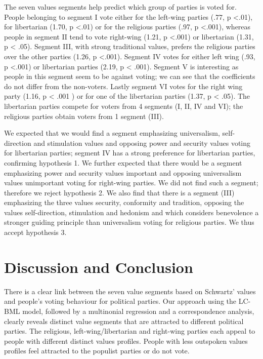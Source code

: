 \documentclass[12pt,letter]{article}\usepackage[]{graphicx}\usepackage[]{xcolor}
\begin{document}
The seven values segments help predict which group of parties is voted for. People belonging to segment I vote either for the left-wing parties (.77, p <.01), for libertarian (1.70, p <.01) or for the religious parties (.97, p <.001), whereas people in segment II tend to vote right-wing (1.21, p <.001) or libertarian (1.31, p < .05). Segment III, with strong traditional values, prefers the religious parties over the other parties (1.26, p <.001). Segment IV votes for either left wing (.93, p <.001) or libertarian parties (2.19, p < .001). Segment V is interesting as people in this segment seem to be against voting; we can see that the coefficients do not differ from the non-voters. Lastly segment VI votes for the right wing party (1.16, p < .001 ) or for one of the libertarian parties (1.37, p < .05). The libertarian parties compete for voters from 4 segments (I, II, IV and VI); the religious parties obtain voters from 1 segment (III).

We expected that we would find a segment emphasizing universalism, self-direction and stimulation values and opposing power and security values voting for libertarian parties; segment IV has a strong preference for libertarian parties, confirming hypothesis 1. We further expected that there would be a segment emphasizing power and security values important and opposing universalism values unimportant voting for right-wing parties. We did not find such a segment; therefore we reject hypothesis 2. We also find that there is a segment (III) emphasizing the three values security, conformity and tradition, opposing the values self-direction, stimulation and hedonism and which  considers benevolence a stronger guiding principle than universalism voting for religious parties. We thus accept hypothesis 3. 

\section*{Discussion and Conclusion}

There is a clear link between the seven value segments based on Schwartz' values and people's voting behaviour for political parties. Our approach using the LC-BML model, followed by a multinonial regression and a correspondence analysis, clearly reveals distinct value segments that are attracted to different political parties. The religious, left-wing/libertarian and right-wing parties each appeal to people with different distinct values profiles. People with less outspoken values profiles feel attracted to the populist parties or do not vote. 
\end{document}
